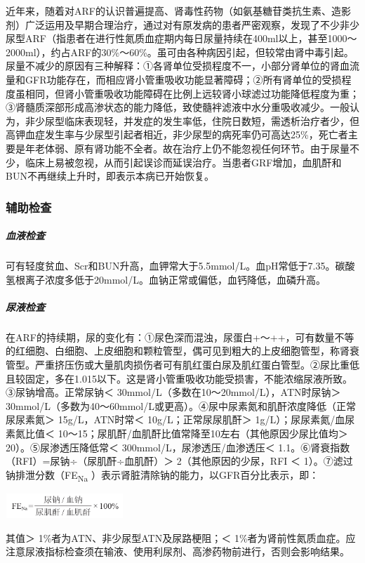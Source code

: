 近年来，随着对ARF的认识普遍提高、肾毒性药物（如氨基糖苷类抗生素、造影剂）广泛运用及早期合理治疗，通过对有原发病的患者严密观察，发现了不少非少尿型ARF（指患者在进行性氮质血症期内每日尿量持续在400ml以上，甚至1000～2000ml），约占ARF的30\%～60\%。虽可由各种病因引起，但较常由肾中毒引起。尿量不减少的原因有三种解释：①各肾单位受损程度不一，小部分肾单位的肾血流量和GFR功能存在，而相应肾小管重吸收功能显著障碍；②所有肾单位的受损程度虽相同，但肾小管重吸收功能障碍在比例上远较肾小球滤过功能降低程度为重；③肾髓质深部形成高渗状态的能力降低，致使髓袢滤液中水分重吸收减少。一般认为，非少尿型临床表现轻，并发症的发生率低，住院日数短，需透析治疗者少，但高钾血症发生率与少尿型引起者相近，非少尿型的病死率仍可高达25\%，死亡者主要是年老体弱、原有肾功能不全者。故在治疗上仍不能忽视任何环节。由于尿量不少，临床上易被忽视，从而引起误诊而延误治疗。当患者GRF增加，血肌酐和BUN不再继续上升时，即表示本病已开始恢复。

\subsubsection{辅助检查}

\subparagraph{血液检查}

可有轻度贫血、Scr和BUN升高，血钾常大于5.5mmol/L。血pH常低于7.35。碳酸氢根离子浓度多低于20mmol/L。血钠正常或偏低，血钙降低，血磷升高。

\subparagraph{尿液检查}

在ARF的持续期，尿的变化有：①尿色深而混浊，尿蛋白+～++，可有数量不等的红细胞、白细胞、上皮细胞和颗粒管型，偶可见到粗大的上皮细胞管型，称肾衰管型。严重挤压伤或大量肌肉损伤者可有肌红蛋白尿及肌红蛋白管型。②尿比重低且较固定，多在1.015以下。这是肾小管重吸收功能受损害，不能浓缩尿液所致。③尿钠增高。正常尿钠＜
30mmol/L（多数在10～20mmol/L），ATN时尿钠＞
30mmol/L（多数为40～60mmol/L或更高）。④尿中尿素氮和肌酐浓度降低（正常尿尿素氮＞
15g/L，ATN时常＜ 10g/L；正常尿尿肌酐＞ 1g/L）；尿尿素氮/血尿素氮比值＜
10～15；尿肌酐/血肌酐比值常降至10左右（其他原因少尿比值均＞
20）。⑤尿渗透压降低常＜ 300mmol/L，尿渗透压/血渗透压＜
1.1。⑥肾衰指数（RFI）=尿钠÷（尿肌酐÷血肌酐）＞ 2（其他原因的少尿，RFI ＜
1）。⑦滤过钠排泄分数（FE\textsubscript{Na}
）表示肾脏清除钠的能力，以GFR百分比表示，即：

\includegraphics[width=1.75in,height=0.36458in]{./images/Image00117.jpg}

其值＞ 1\%者为ATN、非少尿型ATN及尿路梗阻；＜
1\%者为肾前性氮质血症。应注意尿液指标检查须在输液、使用利尿剂、高渗药物前进行，否则会影响结果。

